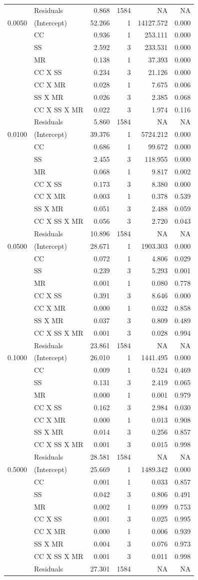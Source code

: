 \documentclass[]{article}
\theoremstyle{definition}
\theoremstyle{definition}
\theoremstyle{remark}
\begin{document}
\begin{longtable}[]{@{}llrrrr@{}}
& Residuals & 0.868 & 1584 & NA & NA\tabularnewline
0.0050 & (Intercept) & 52.266 & 1 & 14127.572 & 0.000\tabularnewline
& CC & 0.936 & 1 & 253.111 & 0.000\tabularnewline
& SS & 2.592 & 3 & 233.531 & 0.000\tabularnewline
& MR & 0.138 & 1 & 37.393 & 0.000\tabularnewline
& CC X SS & 0.234 & 3 & 21.126 & 0.000\tabularnewline
& CC X MR & 0.028 & 1 & 7.675 & 0.006\tabularnewline
& SS X MR & 0.026 & 3 & 2.385 & 0.068\tabularnewline
& CC X SS X MR & 0.022 & 3 & 1.974 & 0.116\tabularnewline
& Residuals & 5.860 & 1584 & NA & NA\tabularnewline
0.0100 & (Intercept) & 39.376 & 1 & 5724.212 & 0.000\tabularnewline
& CC & 0.686 & 1 & 99.672 & 0.000\tabularnewline
& SS & 2.455 & 3 & 118.955 & 0.000\tabularnewline
& MR & 0.068 & 1 & 9.817 & 0.002\tabularnewline
& CC X SS & 0.173 & 3 & 8.380 & 0.000\tabularnewline
& CC X MR & 0.003 & 1 & 0.378 & 0.539\tabularnewline
& SS X MR & 0.051 & 3 & 2.488 & 0.059\tabularnewline
& CC X SS X MR & 0.056 & 3 & 2.720 & 0.043\tabularnewline
& Residuals & 10.896 & 1584 & NA & NA\tabularnewline
0.0500 & (Intercept) & 28.671 & 1 & 1903.303 & 0.000\tabularnewline
& CC & 0.072 & 1 & 4.806 & 0.029\tabularnewline
& SS & 0.239 & 3 & 5.293 & 0.001\tabularnewline
& MR & 0.001 & 1 & 0.080 & 0.778\tabularnewline
& CC X SS & 0.391 & 3 & 8.646 & 0.000\tabularnewline
& CC X MR & 0.000 & 1 & 0.032 & 0.858\tabularnewline
& SS X MR & 0.037 & 3 & 0.809 & 0.489\tabularnewline
& CC X SS X MR & 0.001 & 3 & 0.028 & 0.994\tabularnewline
& Residuals & 23.861 & 1584 & NA & NA\tabularnewline
0.1000 & (Intercept) & 26.010 & 1 & 1441.495 & 0.000\tabularnewline
& CC & 0.009 & 1 & 0.524 & 0.469\tabularnewline
& SS & 0.131 & 3 & 2.419 & 0.065\tabularnewline
& MR & 0.000 & 1 & 0.001 & 0.979\tabularnewline
& CC X SS & 0.162 & 3 & 2.984 & 0.030\tabularnewline
& CC X MR & 0.000 & 1 & 0.013 & 0.908\tabularnewline
& SS X MR & 0.014 & 3 & 0.256 & 0.857\tabularnewline
& CC X SS X MR & 0.001 & 3 & 0.015 & 0.998\tabularnewline
& Residuals & 28.581 & 1584 & NA & NA\tabularnewline
0.5000 & (Intercept) & 25.669 & 1 & 1489.342 & 0.000\tabularnewline
& CC & 0.001 & 1 & 0.033 & 0.857\tabularnewline
& SS & 0.042 & 3 & 0.806 & 0.491\tabularnewline
& MR & 0.002 & 1 & 0.099 & 0.753\tabularnewline
& CC X SS & 0.001 & 3 & 0.025 & 0.995\tabularnewline
& CC X MR & 0.000 & 1 & 0.006 & 0.939\tabularnewline
& SS X MR & 0.004 & 3 & 0.076 & 0.973\tabularnewline
& CC X SS X MR & 0.001 & 3 & 0.011 & 0.998\tabularnewline
& Residuals & 27.301 & 1584 & NA & NA\tabularnewline
\bottomrule
\end{longtable}
\end{document}
